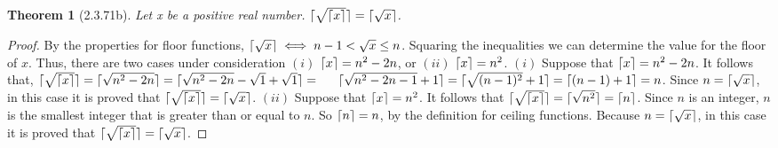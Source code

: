 \documentclass[a4paper, 12pt]{article}
\theoremstyle{plain}
\newtheorem*{theorem*}{Theorem}
\DeclarePairedDelimiter{\ceil}{\lceil}{\rceil}
\begin{document}
	
	\begin{theorem*}[2.3.71b]
		Let x be a positive real number. $\ceil{\sqrt{\ceil{x}}} = \ceil{\sqrt{x}}$.
	\end{theorem*}
	
	\begin{proof}
		By the properties for floor functions, \newline $\ceil{\sqrt{x}} \iff n-1 < \sqrt{x} \le n$. 
		Squaring the inequalities we can determine the value for the floor of $x$. Thus, there are 
		two cases under consideration $(i)$ $\ceil{x} = n^{2} - 2n$, or $(ii)$ $\ceil{x} = n^{2}$.
		\newline
		\newline
		\indent $(i)$ Suppose that $\ceil{x} = n^{2} - 2n$. It follows that, \newline \indent 
		$\ceil{\sqrt{\ceil{x}}} = \ceil{\sqrt{n^{2} - 2n}} = 
		\ceil{\sqrt{n^{2} - 2n} - \sqrt{1} + \sqrt{1}} = \newline \indent 
		\ceil{\sqrt{n^{2} - 2n - 1} + 1} = \ceil{\sqrt{(n-1)^{2}} + 1} = \ceil{(n-1)+1} = n$. 
		Since \indent $n = \ceil{\sqrt{x}}$, in this case it is proved that 
		$\ceil{\sqrt{\ceil{x}}} = \ceil{\sqrt{x}}$.
		\newline
		\newline
		\indent
		$(ii)$ Suppose that $\ceil{x} = n^{2}$. It follows that 
		$\ceil{\sqrt{\ceil{x}}} = \ceil{\sqrt{n^{2}}} = \ceil{n}$. \indent Since $n$ is an integer, 
		$n$ is the smallest integer that is greater than or \indent equal to $n$. So $\ceil{n} = n$, 
		by the definition for ceiling functions. Because \indent $n = \ceil{\sqrt{x}}$, in this case 
		it is proved that $\ceil{\sqrt{\ceil{x}}} = \ceil{\sqrt{x}}$.
	\end{proof}
\end{document}
